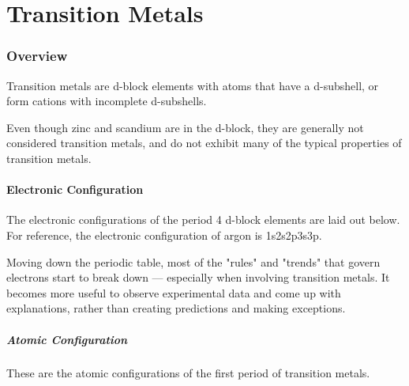 


\pagebreak
\part{Transition Metals}

	\section{Overview}

		Transition metals are d-block elements with atoms that have a  d-subshell, or form cations with incomplete
		d-subshells.


		Even though zinc and scandium are in the d-block, they are generally not considered transition metals, and do not exhibit many
		of the typical properties of transition metals.


		\subsection{Electronic Configuration}

			The electronic configurations of the period 4 d-block elements are laid out below. For reference, the electronic configuration
			of argon is 1s\sps{2}2s2p3s3p.

			Moving down the periodic table, most of the "rules" and "trends" that govern electrons start to break down --- especially when involving
			transition metals. It becomes more useful to observe experimental data and come up with explanations, rather than creating predictions
			and making exceptions.

			\pagebreak
			\subsubsection{Atomic Configuration}

				These are the atomic configurations of the first period of transition metals.

